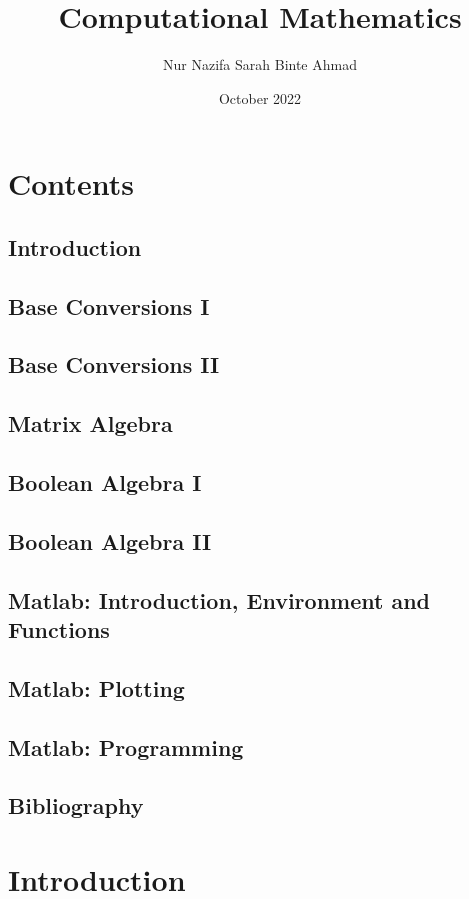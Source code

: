 \documentclass{article}
\title{Computational Mathematics}
\author{Nur Nazifa Sarah Binte Ahmad}
\date{October 2022}
\begin{document}
\maketitle

\newpage

\section*{Contents}
\subsection{Introduction}
\subsection{Base Conversions I}
\subsection{Base Conversions II}
\subsection{Matrix Algebra}
\subsection{Boolean Algebra I}
\subsection{Boolean Algebra II}
\subsection{Matlab: Introduction, Environment and Functions}
\subsection{Matlab: Plotting}
\subsection{Matlab: Programming}
\subsection{Bibliography}

\newpage
\section{Introduction}
\end{document}
